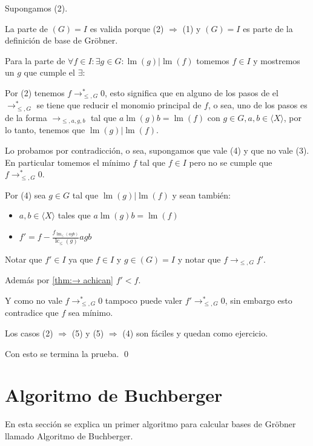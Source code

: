 \documentclass{report}
\theoremstyle{customstyle}
\renewenvironment{proof}[1][\proofname]{{\bfseries #1: }}{\qed} %
\theoremstyle{factstyle}
\DeclareMathOperator{\lm}{lm}
\DeclareMathOperator{\lc}{lc}
\begin{document}
\begin{proof}
\begin{description}
    \item[(2) $⇒$ (4)] Supongamos (2).

    La parte de $(G) = I$ es valida porque (2) $⇒$ (1) y $(G) = I$ es parte de la definición de base de Gröbner.

    Para la parte de $∀f ∈ I : ∃g ∈ G : \lm(g) | \lm(f)$ tomemos $f ∈ I$ y mostremos un $g$ que cumple el $∃$:

    Por (2) tenemos $f →^*_{≤, G} 0$, esto significa que en alguno de los pasos de el $→^*_{≤, G}$ se tiene que reducir el monomio principal de $f$, o sea, uno de los pasos es de la forma $→_{≤, a, g, b}$ tal que $a \lm(g) b = \lm(f)$ con $g ∈ G, a, b ∈ ⟨X⟩$, por lo tanto, tenemos que $\lm(g) | \lm(f)$.

    \item[(4) $⇒$ (3)] Lo probamos por contradicción, o sea, supongamos que vale (4) y que no vale (3). En particular tomemos el mínimo $f$ tal que $f ∈ I$ pero no se cumple que $f →^*_{≤, G} 0$.

    Por (4) sea $g ∈ G$ tal que $\lm(g) | \lm(f)$ y sean también:
    \begin{itemize}
      \item $a, b ∈ ⟨X⟩$ tales que $a \lm(g) b = \lm(f)$
      \item $f' = f - \frac{f_{\lm_≤(agb)}}{\lc_≤(g)}agb$
    \end{itemize}

    Notar que $f' ∈ I$ ya que $f ∈ I$ y $g ∈ (G) = I$ y notar que $f →_{≤, G} f'$.

    Además por \cref{thm:→ achican} $f' < f$.

    Y como no vale $f →^*_{≤, G} 0$ tampoco puede valer $f' →^*_{≤, G} 0$, sin embargo esto contradice que $f$ sea mínimo.

    \item Los casos (2) $⇒$ (5) y (5) $⇒$ (4) son fáciles y quedan como ejercicio. %

  \end{description}
  Con esto se termina la prueba.
\end{proof}


\section{Algoritmo de Buchberger}

En esta sección se explica un primer algoritmo para calcular bases de Gröbner llamado Algoritmo de Buchberger.
\end{document}
